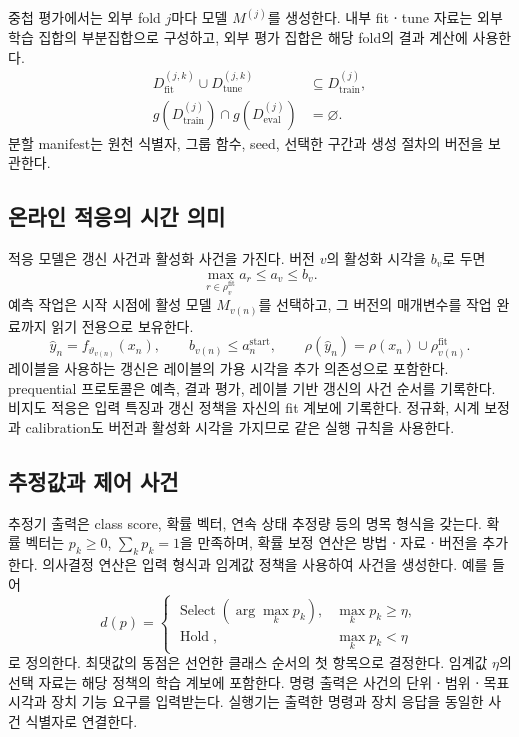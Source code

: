 중첩 평가에서는 외부 fold $j$마다 모델 $M^{(j)}$를 생성한다.
내부 fitㆍtune 자료는 외부 학습 집합의 부분집합으로 구성하고,
외부 평가 집합은 해당 fold의 결과 계산에 사용한다.
\begin{equation}
 \begin{aligned}
 D_{\mathrm{fit}}^{(j,k)}\cup D_{\mathrm{tune}}^{(j,k)}
 &\subseteq D_{\mathrm{train}}^{(j)},\\
 g(D_{\mathrm{train}}^{(j)})\cap g(D_{\mathrm{eval}}^{(j)})
 &=\varnothing.
 \end{aligned}
\end{equation}
분할 manifest는 원천 식별자, 그룹 함수, seed, 선택한 구간과 생성 절차의 버전을 보관한다.

\subsection{온라인 적응의 시간 의미}
적응 모델은 갱신 사건과 활성화 사건을 가진다. 버전 $v$의 활성화 시각을 $b_v$로 두면
\begin{equation}
 \max_{r\in\rho_v^{\mathrm{fit}}}a_r\le a_v\le b_v.
 \label{eq:modeltime}
\end{equation}
예측 작업은 시작 시점에 활성 모델 $M_{v(n)}$를 선택하고,
그 버전의 매개변수를 작업 완료까지 읽기 전용으로 보유한다.
\begin{equation}
 \widehat y_n=f_{\vartheta_{v(n)}}(x_n),\qquad
 b_{v(n)}\le a_n^{\mathrm{start}},\qquad
 \rho(\widehat y_n)=\rho(x_n)\cup\rho_{v(n)}^{\mathrm{fit}}.
\end{equation}
레이블을 사용하는 갱신은 레이블의 가용 시각을 추가 의존성으로 포함한다.
prequential 프로토콜은 예측, 결과 평가, 레이블 기반 갱신의 사건 순서를 기록한다.
비지도 적응은 입력 특징과 갱신 정책을 자신의 fit 계보에 기록한다.
정규화, 시계 보정과 calibration도 버전과 활성화 시각을 가지므로 같은 실행 규칙을 사용한다.

\subsection{추정값과 제어 사건}
추정기 출력은 class score, 확률 벡터, 연속 상태 추정량 등의 명목 형식을 갖는다.
확률 벡터는 $p_k\ge0$, $\sum_kp_k=1$을 만족하며,
확률 보정 연산은 방법ㆍ자료ㆍ버전을 추가한다.
의사결정 연산은 입력 형식과 임계값 정책을 사용하여 사건을 생성한다.
예를 들어
\begin{equation}
 d(p)=
 \begin{cases}
 \operatorname{Select}(\arg\max_kp_k),&\max_kp_k\ge\eta,\\
 \operatorname{Hold},&\max_kp_k<\eta
 \end{cases}
\end{equation}
로 정의한다. 최댓값의 동점은 선언한 클래스 순서의 첫 항목으로 결정한다.
임계값 $\eta$의 선택 자료는 해당 정책의 학습 계보에 포함한다.
명령 출력은 사건의 단위ㆍ범위ㆍ목표 시각과 장치 기능 요구를 입력받는다.
실행기는 출력한 명령과 장치 응답을 동일한 사건 식별자로 연결한다.

